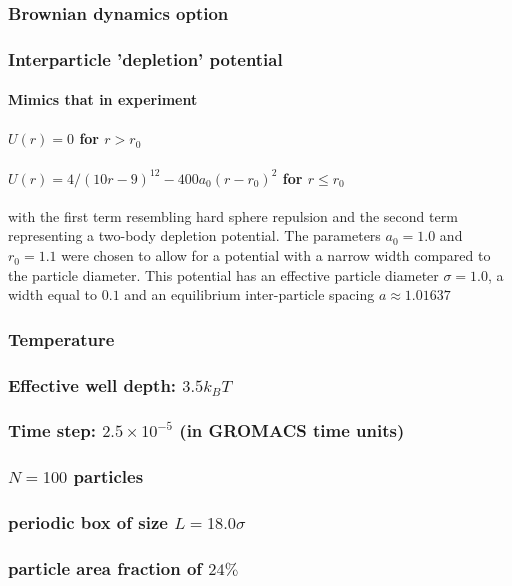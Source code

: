 \documentclass{umthesis}
\begin{document}
\subsubsection{Brownian dynamics option}
\label{sec-1.3.2.1}
\subsubsection{Interparticle 'depletion' potential}
\label{sec-1.3.2.2}
\paragraph{Mimics that in experiment}
\label{sec-1.3.2.2.1}
\paragraph{$U(r)=0$ for $r > r_0$}
\label{sec-1.3.2.2.2}
\paragraph{$U(r)=4/(10r-9)^{12} -  400 a_0 (r-r_0)^2$ for $r \le r_0$}
\label{sec-1.3.2.2.3}

with the first term resembling hard sphere repulsion and the second term  representing a two-body depletion potential. The parameters $a_0=1.0$ and $r_0=1.1$ were chosen to allow for  a potential with a narrow width compared to the particle diameter. This potential has an effective particle diameter $\sigma=1.0$,  a width equal to $0.1$ and an equilibrium inter-particle spacing $a \approx 1.01637$
\subsubsection{Temperature}
\label{sec-1.3.2.3}
\subsubsection{Effective well depth: $3.5 k_B T$}
\label{sec-1.3.2.4}
\subsubsection{Time step: $2.5 \times 10^{-5}$ (in GROMACS time units)}
\label{sec-1.3.2.5}
\subsubsection{$N=100$ particles}
\label{sec-1.3.2.6}
\subsubsection{periodic box of size $L = 18.0 \sigma$}
\label{sec-1.3.2.7}
\subsubsection{particle area fraction of $24\%$}
\label{sec-1.3.2.8}
\end{document}
